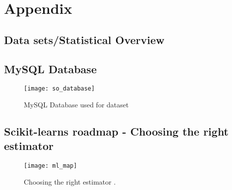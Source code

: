 \appendix

\chapter{Appendix}
\label{app:acronyms}
\printindex
\printglossaries

\section{Data sets/Statistical Overview}
\label{app:data_sets}

\clearpage
\section{MySQL Database}
\label{app:mysql_database}
\begin{figure}[ht]
	\centering
    \texttt{[image: so\_database]}
	\caption{MySQL Database used for dataset}
	\label{fig:mysql_database}
\end{figure}

\clearpage
\section{Scikit-learns roadmap - Choosing the right estimator}
\label{app:ml_map}
\begin{figure}[ht]
	\centering
	\texttt{[image: ml\_map]}
	\caption[Choosing the right estimator]{Choosing the right estimator \cite{Scikitlearn.org2016i}.}
	\label{fig:ml_map}
\end{figure}



\begin{comment}
\begin{table}[tbp]
\centering
\begin{tabular}{| c | c | c | c | c | c | c | c |}
\hline
~ 					& Code sample	& Numerical		& Hexadecimal	& Homework		& Link 		& Tags	\\ \hline
Score 				& 0.783			& 0.796			& 0.793			& 0.794			& 0.795 	& 0.757	\\ \hline
C					& 1000			& 1000			& 1000			& 1000			& 1000 		& 1000	\\ \hline
Gamma ($\gamma$)	& 0.001			& 0.001			& 0.001			& 0.001			& 0.001 	& 0.001	\\ \hline
Kernel				& RBF			& RBF			& RBF			& RBF			& RBF 		& RBF	\\ \hline
\end{tabular}
\caption{Comparison of raw data set (unprocessed) and singular feature detectors}
\end{table}
\end{comment}

